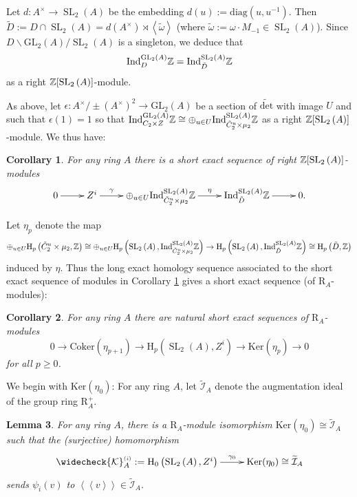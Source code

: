 \documentclass[12pt]{amsart}
\newtheorem{lem}{Lemma}[section]
\newtheorem{cor}[lem]{Corollary}
\theoremstyle{definition}
\newcommand{\Z}{\Bbb{Z}}
\newcommand{\K}{\mathcal{K}}
\newcommand{\spl}[2]{\operatorname{SL}_{#1}\left(#2\right)}
\newcommand{\gl}[2]{\mathrm{GL}_{#1}(#2)}
\newcommand{\suss}[2]{\psi_{#1}\left( #2\right)}
\newcommand{\cks}[2]{\widecheck{{\K}}^{\mbox{\tiny $(#1)$}}_{#2}}
\newcommand{\<}{\langle}
\renewcommand{\>}{\rangle}
\renewcommand{\ker}[1]{\mathrm{Ker}(#1)}
\newcommand{\coker}[1]{\mathrm{Coker}\left(#1\right)}
\newcommand{\sgr}[1]{\mathrm{R}_{#1}}%
\newcommand{\qsgr}[1]{\mathrm{R}^{+}_{#1}} %
\newcommand{\an}[1]{\left\langle{#1}\right\rangle}
\newcommand{\pf}[1]{\left\langle\!\left\langle{#1}\right\rangle\!\right\rangle}
\newcommand{\qaug}[1]{\widetilde{\mathcal{I}}_{#1}}
\newcommand{\oodet}{\widetilde{\mathrm{det}}}
\newcommand{\ho}[3]{\mathrm{H}_{#1}\left( #2,#3 \right)}
\newcommand{\Ind}[3]{\mathrm{Ind}_{#1}^{#2}#3}
\begin{document}
Let $d:A^\times\to \spl{2}{A}$ be the embedding  $d(u):=\mathrm{diag}(u,u^{-1})$. Then $\tilde{D}:=D\cap\spl{2}{A}=d(A^\times)\rtimes \an{\tilde{\omega}}$
(where $\tilde{\omega}:=\omega\cdot M_{-1}\in\spl{2}{A}$). Since $D\backslash \gl{2}{A}/\spl{2}{A}$ is a singleton, we deduce that 
\[
\Ind{D}{\gl{2}{A}}{\Z}=\Ind{\tilde{D}}{\spl{2}{A}}{\Z}
\]
as a right $\Z[\spl{2}{A}]$-module.

As above, let $\epsilon:A^\times/\pm(A^\times)^2\to \gl{2}{A}$ be a section of $\oodet$ with image $U$ and such that $\epsilon(1)=1$ so that 
$\Ind{C_2\times Z}{\gl{2}{A}}{\Z}\cong \oplus_{u\in U}\Ind{\tilde{C}_2^u\times\mu_2}{\spl{2}{A}}{\Z}$ as a right $\Z[\spl{2}{A}]$-module. We thus have:

\begin{cor}\label{cor:zispl}  For any ring $A$ there is a short exact sequence of right $\Z[\spl{2}{A}]$-modules
\[
\xymatrix{
0\ar[r] &Z^i\ar^-{\gamma}[r]& \oplus_{u\in U}\Ind{\tilde{C}_2^u\times \mu_2}{\spl{2}{A}}{\Z}\ar^-{\eta}[r]&\Ind{\tilde{D}}{\spl{2}{A}}{\Z}\ar[r]&0.
}
\]
\end{cor}


 Let $\eta_p$ denote the map  
\[
\oplus_{u\in U}\ho{p}{\tilde{C}_2^u\times \mu_2}{\Z}\cong \oplus_{u\in U}\ho{p}{\spl{2}{A}}{\Ind{\tilde{C}_2^u\times \mu_2}{\spl{2}{A}}{\Z}}\to \ho{p}{\spl{2}{A}}{\Ind{\tilde{D}}{\spl{2}{A}}{\Z}}
\cong\ho{p}{\tilde{D}}{\Z}
\]
 induced by 
$\eta$. Thus the  long exact homology sequence associated to the short exact sequence of modules in Corollary \ref{cor:zispl} gives a short exact sequence (of $\sgr{A}$-modules):
\begin{cor}\label{cor:zieta} For any ring $A$ there are natural short exact sequences of $\sgr{A}$-modules
\[
0\to \coker{\eta_{p+1}}\to \ho{p}{\spl{2}{A}}{Z^i}\to \ker{\eta_p}\to 0
\]
for all $p\geq 0$.
\end{cor}


We begin with $\ker{\eta_0}$:
For any ring $A$, let $\qaug{A}$ denote the augmentation ideal of the group ring $\qsgr{A}$.

\begin{lem}\label{lem:eta0} For any ring $A$, there is a $\sgr{A}$-module isomorphism $\ker{\eta_0}\cong\qaug{A}$ such that the (surjective) homomorphism 
\[
\xymatrix{
\cks{i}{A}:=\ho{0}{\spl{2}{A}}{Z^i}\ar^-{\gamma_0}[r]&\ker{\eta_0}\cong\qaug{A}\\
}
\]
sends $\suss{i}{v}$ to $\pf{v}\in \qaug{A}$.
\end{lem}
\end{document}
